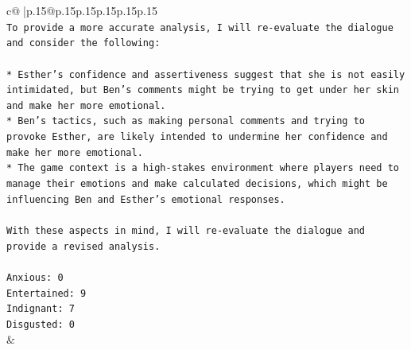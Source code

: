 \documentclass{article}
\begin{document}
{\begin{supertabular}{c@{$\;$}|p{.15\linewidth}@{}p{.15\linewidth}p{.15\linewidth}p{.15\linewidth}p{.15\linewidth}p{.15\linewidth}}
{{{\\ 
\texttt{To provide a more accurate analysis, I will re{-}evaluate the dialogue and consider the following:} \\
\\ 
\texttt{* Esther's confidence and assertiveness suggest that she is not easily intimidated, but Ben's comments might be trying to get under her skin and make her more emotional.} \\
\texttt{* Ben's tactics, such as making personal comments and trying to provoke Esther, are likely intended to undermine her confidence and make her more emotional.} \\
\texttt{* The game context is a high{-}stakes environment where players need to manage their emotions and make calculated decisions, which might be influencing Ben and Esther's emotional responses.} \\
\\ 
\texttt{With these aspects in mind, I will re{-}evaluate the dialogue and provide a revised analysis.} \\
\\ 
\texttt{Anxious: 0} \\
\texttt{Entertained: 9} \\
\texttt{Indignant: 7} \\
\texttt{Disgusted: 0} \\
            }
        }
    }
    & \\ \\

\end{supertabular}
}
\end{document}
